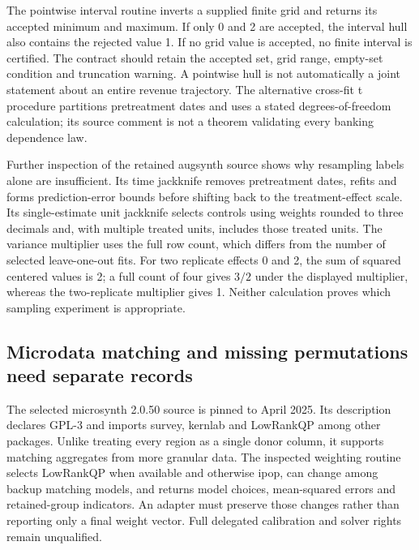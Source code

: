 The pointwise interval routine inverts a supplied finite grid and returns
its accepted minimum and maximum. If only 0 and 2 are accepted, the interval
hull also contains the rejected value 1. If no grid value is accepted, no
finite interval is certified. The contract should retain the accepted set,
grid range, empty-set condition and truncation warning. A pointwise hull is
not automatically a joint statement about an entire revenue trajectory.
The alternative cross-fit t procedure partitions pretreatment dates and
uses a stated degrees-of-freedom calculation; its source comment is not a
theorem validating every banking dependence law.\citep{exec25_synthr_scinference,
exec25_synthr_choice}

Further inspection of the retained augsynth source shows why resampling
labels alone are insufficient. Its time jackknife removes pretreatment
dates, refits and forms prediction-error bounds before shifting back to
the treatment-effect scale. Its single-estimate unit jackknife selects
controls using weights rounded to three decimals and, with multiple treated
units, includes those treated units. The variance multiplier uses the full
row count, which differs from the number of selected leave-one-out fits.
For two replicate effects 0 and 2, the sum of squared centered values is 2;
a full count of four gives $3/2$ under the displayed multiplier, whereas
the two-replicate multiplier gives 1. Neither calculation proves which
sampling experiment is appropriate.\citep{exec25_synthr_auginference,
exec25_synthr_choice}

\subsection{Microdata matching and missing permutations need separate records}
The selected microsynth 2.0.50 source is pinned to April 2025. Its description
declares GPL-3 and imports survey, kernlab and LowRankQP among other packages.
Unlike treating every region as a single donor column, it supports matching
aggregates from more granular data. The inspected weighting routine selects
LowRankQP when available and otherwise ipop, can change among backup matching
models, and returns model choices, mean-squared errors and retained-group
indicators. An adapter must preserve those changes rather than reporting
only a final weight vector. Full delegated calibration and solver rights
remain unqualified.\citep{exec25_synthr_microsynth}

